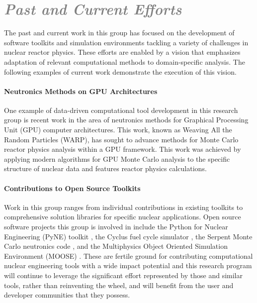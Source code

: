 \documentclass[a4paper, 10pt]{article}
\begin{document}
\section*{\textcolor{gray}{\it Past and Current Efforts}}

The past and current work in this group has focused on the development of 
software toolkits and simulation environments tackling a variety of challenges 
in nuclear reactor physics. These efforts are enabled by a vision that 
emphasizes adaptation of relevant computational methods to domain-specific 
analysis. The following examples of current work demonstrate the 
execution of this vision.

\paragraph{Neutronics Methods on GPU Architectures}

One example of data-driven computational tool development in this research group 
is recent work in the area of neutronics methods for Graphical Processing Unit 
(GPU) computer architectures. This work, known as Weaving All the Random 
Particles (WARP), has sought to advance methods for Monte Carlo reactor physics 
analysis within a GPU framework. This work was achieved by applying modern 
algorithms for GPU Monte Carlo analysis to the specific structure of nuclear 
data and features reactor physics calculations.



\paragraph{Contributions to Open Source Toolkits}

Work in this group ranges from individual contributions in existing toolkits to 
comprehensive solution libraries for specific nuclear applications.  Open source 
software projects this group is involved in include the Python for Nuclear 
Engineering (PyNE) toolkit \cite{pyne_pyne_2011}, the Cyclus fuel cycle 
simulator \cite{huff_cyclus_2011}, the Serpent Monte Carlo neutronics code 
\cite{leppanen_serpentcontinuous-energy_2012}, and the Multiphysics Object Oriented Simulation 
Environment (MOOSE) \cite{gaston_moose:_2009}. These are fertile ground for 
contributing computational nuclear engineering tools with a wide impact 
potential and this research program will continue to leverage the significant 
effort represented by those and similar tools, rather than reinventing the 
wheel, and will benefit from the user and developer communities that they 
possess.  
\end{document}
